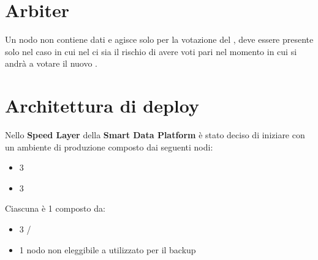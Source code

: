 \documentclass[a4paper,10pt,english]{sphinxmanual}
\begin{document}
\section{Arbiter}
\label{cluster_architecture/architecture:arbiter}\label{cluster_architecture/architecture:id9}
Un nodo  non contiene dati e agisce solo per la votazione del {\hyperref[cluster_architecture/architecture:primary]{\emph{}}}, deve
essere presente solo nel caso in cui nel {\hyperref[cluster_architecture/architecture:replica-set]{\emph{}}} ci sia il rischio di avere voti pari
nel momento in cui si andrà a votare il nuovo {\hyperref[cluster_architecture/architecture:primary]{\emph{}}}.


\section{Architettura di deploy}
\label{cluster_architecture/architecture:architettura-di-deploy}\label{cluster_architecture/architecture:deploy-architecture}
Nello \textbf{Speed Layer} della \textbf{Smart Data Platform} è stato deciso di iniziare con un ambiente
di produzione composto dai seguenti nodi:
\begin{itemize}
\item {} 
3 {\hyperref[cluster_architecture/architecture:shard]{\emph{}}}

\item {} 
3 {\hyperref[cluster_architecture/architecture:config-server]{\emph{}}}

\end{itemize}

Ciascuna {\hyperref[cluster_architecture/architecture:shard]{\emph{}}} è 1 {\hyperref[cluster_architecture/architecture:replica-set]{\emph{}}} composto da:
\begin{itemize}
\item {} 
3 {\hyperref[cluster_architecture/architecture:primary]{\emph{}}}/{\hyperref[cluster_architecture/architecture:secondary]{\emph{}}}

\item {} 
1 nodo non eleggibile a {\hyperref[cluster_architecture/architecture:primary]{\emph{}}} utilizzato per il backup

\end{itemize}
\end{document}
